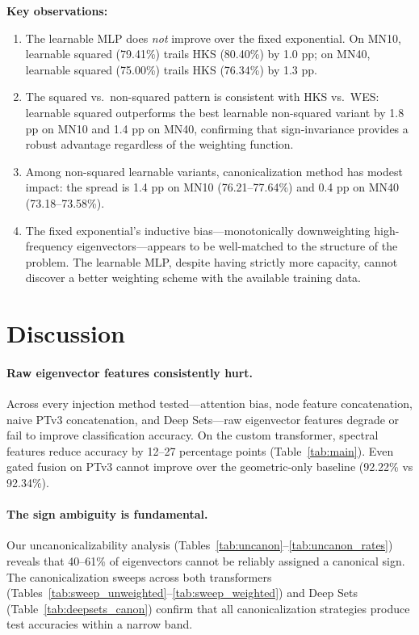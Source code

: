 \documentclass[11pt]{article}
\begin{document}
\textbf{Key observations:}
\begin{enumerate}[nosep]
    \item The learnable MLP does \emph{not} improve over the fixed exponential. On MN10,
          learnable squared (79.41\%) trails HKS (80.40\%) by 1.0 pp; on MN40, learnable
          squared (75.00\%) trails HKS (76.34\%) by 1.3 pp.
    \item The squared vs.\ non-squared pattern is consistent with HKS vs.\ WES: learnable
          squared outperforms the best learnable non-squared variant by 1.8 pp on MN10 and
          1.4 pp on MN40, confirming that sign-invariance provides a robust advantage
          regardless of the weighting function.
    \item Among non-squared learnable variants, canonicalization method has modest impact:
          the spread is 1.4 pp on MN10 (76.21--77.64\%) and 0.4 pp on MN40
          (73.18--73.58\%).
    \item The fixed exponential's inductive bias---monotonically downweighting high-frequency
          eigenvectors---appears to be well-matched to the structure of the problem. The
          learnable MLP, despite having strictly more capacity, cannot discover a better
          weighting scheme with the available training data.
\end{enumerate}

\section{Discussion}

\paragraph{Raw eigenvector features consistently hurt.}
Across every injection method tested---attention bias, node feature concatenation, naive
PTv3 concatenation, and Deep Sets---raw eigenvector features degrade or fail to improve
classification accuracy. On the custom transformer, spectral features reduce accuracy by
12--27 percentage points (Table~\ref{tab:main}). Even gated fusion on PTv3 cannot improve
over the geometric-only baseline (92.22\% vs 92.34\%).

\paragraph{The sign ambiguity is fundamental.}
Our uncanonicalizability analysis (Tables~\ref{tab:uncanon}--\ref{tab:uncanon_rates}) reveals
that 40--61\% of eigenvectors cannot be reliably assigned a canonical sign. The
canonicalization sweeps across both transformers
(Tables~\ref{tab:sweep_unweighted}--\ref{tab:sweep_weighted}) and Deep Sets
(Table~\ref{tab:deepsets_canon}) confirm that all canonicalization strategies produce
test accuracies within a narrow band.
\end{document}
